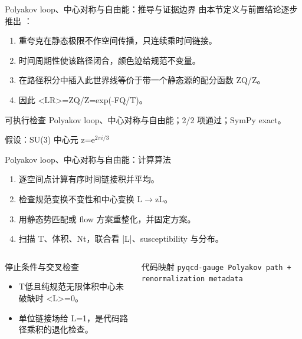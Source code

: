 \begin{frame}[t]{Polyakov loop、中心对称与自由能：推导与证据边界}
\footnotesize
{}\quad 由本节定义与前置结论逐步推出 ：
\begin{enumerate}
\item 重夸克在静态极限不作空间传播，只连续乘时间链接。
\item 时间周期性使该路径闭合，颜色迹给规范不变量。
\item 在路径积分中插入此世界线等价于带一个静态源的配分函数 ZQ/\allowbreak{}Z。
\item 因此 <LR>=ZQ/\allowbreak{}Z=exp(-FQ/\allowbreak{}T)。
\end{enumerate}\begin{block}{可执行检查}
\quad Polyakov loop、中心对称与自由能；2/2 项通过；SymPy exact。
\par\scriptsize 假设：SU(3) 中心元 z=e\ensuremath{^{2\pi{}i/3}}
\end{block}
\end{frame}

\begin{frame}[t]{Polyakov loop、中心对称与自由能：计算算法}
\footnotesize
{}\begin{enumerate}
\item 逐空间点计算有序时间链接积并平均。
\item 检查规范变换不变性和中心变换 L\ensuremath{\rightarrow}zL。
\item 用静态势匹配或 flow 方案重整化，并固定方案。
\item 扫描 T、体积、Nt，联合看 |L|、susceptibility 与分布。
\end{enumerate}\begin{columns}[T,onlytextwidth]
\begin{block}{停止条件与交叉检查}\scriptsize\begin{itemize}
\item[\CheckMark] T低且纯规范无限体积中心未破缺时 <L>=0。
\item[\CheckMark] 单位链接场给 L=1，是代码路径乘积的退化检查。
\end{itemize}\end{block}
\begin{block}{代码映射}
\scriptsize \texttt{pyqcd-gauge Polyakov path + renormalization metadata}
\end{block}\end{columns}\end{frame}

